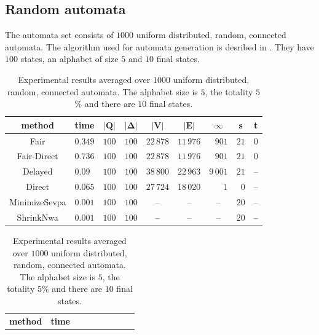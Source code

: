 \documentclass[12pt,oneside,bibliography=totoc,abstracton]{scrartcl}
\newcommand{\emptyccell}{\multicolumn{1}{c}{--}}
\newcommand{\emptyccellrightended}{\multicolumn{1}{c|}{--}}
\newcommand{\libref}[1]{\textbf{\cite{#1}}}
\begin{document}
\subsection{Random automata}\label{section_randomautomata}
The automata set consists of $1000$ uniform distributed, random, connected automata.
The algorithm used for automata generation is desribed in \libref{randomdfa}.
They have $100$ states, an alphabet of size $5$ and $10$ final states.
\begin{table}[h]
	 \begin{center}
		\begin{tabular}{|c|lrrrrrrr|}
			\hline
			\multicolumn{1}{|c|}{\cellcolor{black!30}\textbf{method}}
			&\multicolumn{1}{c}{\cellcolor{black!30}\textbf{time}}
			&\multicolumn{1}{c}{\cellcolor{black!30}$\bm{|Q|}$}
			&\multicolumn{1}{c}{\cellcolor{black!30}$\bm{|\Delta|}$}
			&\multicolumn{1}{c}{\cellcolor{black!30}$\bm{|V|}$}
			&\multicolumn{1}{c}{\cellcolor{black!30}$\bm{|E|}$}
			&\multicolumn{1}{c}{\cellcolor{black!30}$\bm{\infty}$}
			&\multicolumn{1}{c}{\cellcolor{black!30}\textbf{s}}
			&\multicolumn{1}{c|}{\cellcolor{black!30}\textbf{t}}\\
			\hline
			Fair			&$0.349$	&$100$	&$100$	&$22\,878$	&$11\,976$	&$901$	&$21$	&$0$\\
			Fair-Direct		&$0.736$	&$100$	&$100$	&$22\,878$	&$11\,976$	&$901$	&$21$	&$0$\\
			Delayed		&$0.09$	&$100$	&$100$	&$38\,800$	&$22\,963$	&$9\,001$	&$21$	&\emptyccellrightended\\
			Direct			&$0.065$	&$100$	&$100$	&$27\,724$	&$18\,020$	&$1$		&$0$	&\emptyccellrightended\\
			MinimizeSevpa	&$0.001$	&$100$	&$100$	&\emptyccell	&\emptyccell	&\emptyccell	&$20$	&\emptyccellrightended\\
			ShrinkNwa		&$0.001$	&$100$	&$100$	&\emptyccell	&\emptyccell	&\emptyccell	&$20$	&\emptyccellrightended\\
			\hline
		\end{tabular}
	\end{center}
	\caption{Experimental results averaged over $1000$ uniform distributed, random, connected automata.
		The alphabet size is $5$, the totality $5$\% and there are $10$ final states.}
	\label{random5tot}
	 \begin{center}
		\begin{tabular}{|c|lrrrrrrr|}
			\hline
			\multicolumn{1}{|c|}{\cellcolor{black!30}\textbf{method}}
			&\multicolumn{1}{c}{\cellcolor{black!30}\textbf{time}}

\end{tabular}
\end{center}
\end{table}
\end{document}
